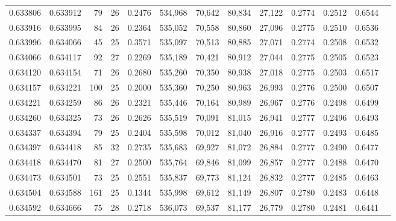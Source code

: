 \begin{tabular}{rrrrrrrrrrrrr}
0.633806 & 0.633912 &  79 &  26 &                                     0.2476 & 534,968 &  70,642 &  80,834 &  27,122 & 0.2774 & 0.2512 & 0.6544 \\
0.633916 & 0.633995 &  84 &  26 &                                     0.2364 & 535,052 &  70,558 &  80,860 &  27,096 & 0.2775 & 0.2510 & 0.6536 \\
0.633996 & 0.634066 &  45 &  25 &                                     0.3571 & 535,097 &  70,513 &  80,885 &  27,071 & 0.2774 & 0.2508 & 0.6532 \\
0.634066 & 0.634117 &  92 &  27 &                                     0.2269 & 535,189 &  70,421 &  80,912 &  27,044 & 0.2775 & 0.2505 & 0.6523 \\
0.634120 & 0.634154 &  71 &  26 &                                     0.2680 & 535,260 &  70,350 &  80,938 &  27,018 & 0.2775 & 0.2503 & 0.6517 \\
0.634157 & 0.634221 & 100 &  25 &                                     0.2000 & 535,360 &  70,250 &  80,963 &  26,993 & 0.2776 & 0.2500 & 0.6507 \\
0.634221 & 0.634259 &  86 &  26 &                                     0.2321 & 535,446 &  70,164 &  80,989 &  26,967 & 0.2776 & 0.2498 & 0.6499 \\
0.634260 & 0.634325 &  73 &  26 &                                     0.2626 & 535,519 &  70,091 &  81,015 &  26,941 & 0.2777 & 0.2496 & 0.6493 \\
0.634337 & 0.634394 &  79 &  25 &                                     0.2404 & 535,598 &  70,012 &  81,040 &  26,916 & 0.2777 & 0.2493 & 0.6485 \\
0.634397 & 0.634418 &  85 &  32 &                                     0.2735 & 535,683 &  69,927 &  81,072 &  26,884 & 0.2777 & 0.2490 & 0.6477 \\
0.634418 & 0.634470 &  81 &  27 &                                     0.2500 & 535,764 &  69,846 &  81,099 &  26,857 & 0.2777 & 0.2488 & 0.6470 \\
0.634473 & 0.634501 &  73 &  25 &                                     0.2551 & 535,837 &  69,773 &  81,124 &  26,832 & 0.2777 & 0.2485 & 0.6463 \\
0.634504 & 0.634588 & 161 &  25 &                                     0.1344 & 535,998 &  69,612 &  81,149 &  26,807 & 0.2780 & 0.2483 & 0.6448 \\
0.634592 & 0.634666 &  75 &  28 &                                     0.2718 & 536,073 &  69,537 &  81,177 &  26,779 & 0.2780 & 0.2481 & 0.6441 \\

\end{tabular}
